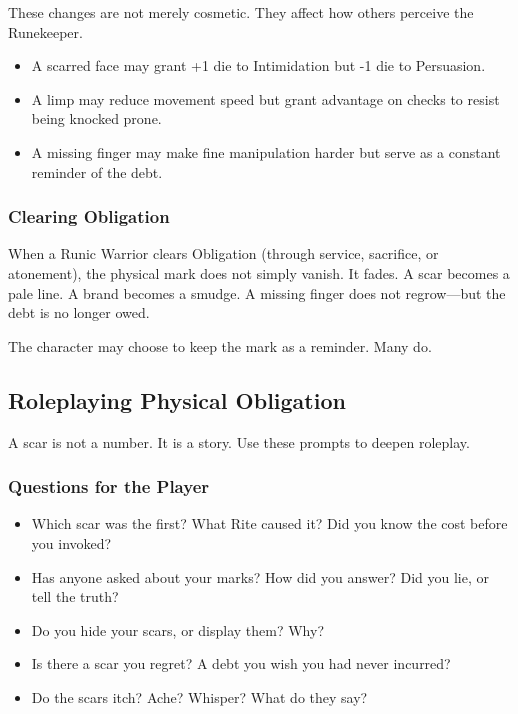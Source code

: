 These changes are not merely cosmetic. They affect how others perceive the Runekeeper.

\begin{itemize}
\item A scarred face may grant +1 die to Intimidation but -1 die to Persuasion.
\item A limp may reduce movement speed but grant advantage on checks to resist being knocked prone.
\item A missing finger may make fine manipulation harder but serve as a constant reminder of the debt.
\end{itemize}

\subsubsection{Clearing Obligation}

When a Runic Warrior clears Obligation (through service, sacrifice, or atonement), the physical mark does not simply vanish. It fades. A scar becomes a pale line. A brand becomes a smudge. A missing finger does not regrow—but the debt is no longer owed.

The character may choose to keep the mark as a reminder. Many do.

\subsection{Roleplaying Physical Obligation}

A scar is not a number. It is a story. Use these prompts to deepen roleplay.

\subsubsection{Questions for the Player}

\begin{itemize}
\item Which scar was the first? What Rite caused it? Did you know the cost before you invoked?
\item Has anyone asked about your marks? How did you answer? Did you lie, or tell the truth?
\item Do you hide your scars, or display them? Why?
\item Is there a scar you regret? A debt you wish you had never incurred?
\item Do the scars itch? Ache? Whisper? What do they say?
\end{itemize}

